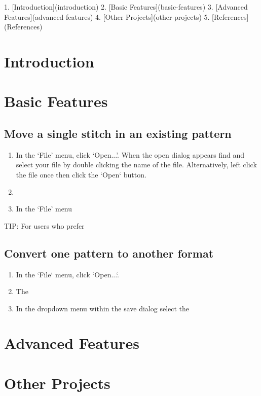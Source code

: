 \documentclass[a4paper, 11pt]{report}
\begin{document}
  1. [Introduction](introduction)
  2. [Basic Features](basic-features)
  3. [Advanced Features](advanced-features)
  4. [Other Projects](other-projects)
  5. [References](References)

\section{Introduction}

\section{Basic Features}

\subsection{Move a single stitch in an existing pattern}

\begin{enumerate}
\item In the `File' menu, click `Open...'. When the open dialog appears find
  and select your file by double clicking the name of the file. Alternatively,
  left click the file once then click the `Open` button.
\item
\item In the `File' menu
\end{enumerate}

TIP: For users who prefer

\subsection{Convert one pattern to another format}

\begin{enumerate}
\item In the `File` menu, click `Open...`.
\item The 
\item In the dropdown menu within the save dialog select the 
\end{enumerate}

\section{Advanced Features}

\section{Other Projects}
\end{document}
